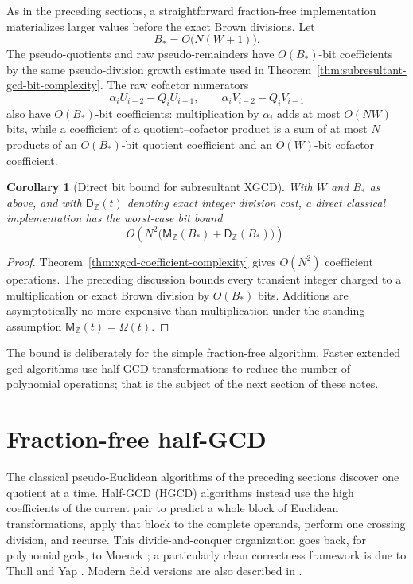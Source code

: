 \documentclass[11pt]{book}
\newtheorem{corollary}[theorem]{Corollary}
\theoremstyle{definition}
\newcommand{\ZZ}{\mathbb Z}
\newcommand{\MZ}{\mathsf M_{\ZZ}}
\begin{document}
As in the preceding sections, a straightforward fraction-free implementation
materializes larger values before the exact Brown divisions.  Let
\[
 B_*=O\bigl(N(W+1)\bigr).
\]
The pseudo-quotients and raw pseudo-remainders have $O(B_*)$-bit coefficients
by the same pseudo-division growth estimate used in
Theorem~\ref{thm:subresultant-gcd-bit-complexity}.  The raw cofactor
numerators
\[
 \alpha_iU_{i-2}-Q_iU_{i-1},
 \qquad
 \alpha_iV_{i-2}-Q_iV_{i-1}
\]
also have $O(B_*)$-bit coefficients: multiplication by $\alpha_i$ adds at
most $O(NW)$ bits, while a coefficient of a quotient--cofactor product is a
sum of at most $N$ products of an $O(B_*)$-bit quotient coefficient and an
$O(W)$-bit cofactor coefficient.

\begin{corollary}[Direct bit bound for subresultant XGCD]
\label{cor:xgcd-bit-complexity}
With $W$ and $B_*$ as above, and with $\mathsf D_{\ZZ}(t)$ denoting exact
integer division cost, a direct classical implementation has the worst-case
bit bound
\begin{equation}\label{eq:xgcd-bit-complexity}
 O\!\left(
   N^2\bigl(\MZ(B_*)+\mathsf D_{\ZZ}(B_*)\bigr)
 \right).
\end{equation}
\end{corollary}

\begin{proof}
Theorem~\ref{thm:xgcd-coefficient-complexity} gives $O(N^2)$ coefficient
operations.  The preceding discussion bounds every transient integer charged
to a multiplication or exact Brown division by $O(B_*)$ bits.  Additions are
asymptotically no more expensive than multiplication under the standing
assumption $\MZ(t)=\Omega(t)$.
\end{proof}

The bound is deliberately for the simple fraction-free algorithm.  Faster
extended gcd algorithms use half-GCD transformations to reduce the number of
polynomial operations; that is the subject of the next section of these
notes.


\section{Fraction-free half-GCD}
\label{sec:zz-poly-hgcd}

The classical pseudo-Euclidean algorithms of the preceding sections discover
one quotient at a time.  Half-GCD (HGCD) algorithms instead use the high
coefficients of the current pair to predict a whole block of Euclidean
transformations, apply that block to the complete operands, perform one
crossing division, and recurse.  This divide-and-conquer organization goes
back, for polynomial gcds, to Moenck \cite{Moenck1973}; a particularly clean
correctness framework is due to Thull and Yap \cite{ThullYap1990}.  Modern
field versions are also described in \cite{vonZurGathenGerhard2013}.
\end{document}
